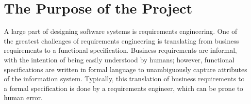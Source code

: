 %

% 
% 


{\section{The Purpose of the Project}\label{sec:Purpose}}

A large part of designing software systems is requirements engineering. One
of the greatest challenges of requirements engineering is translating from
business requirements to a functional specification. Business requirements are
informal, with the intention of being easily understood by humans; however,
functional specifications are written in formal language to unambiguously capture attributes of the 
information system. Typically, this translation
of business requirements to a formal specification is done by a requirements
engineer, which can be prone to human error.

